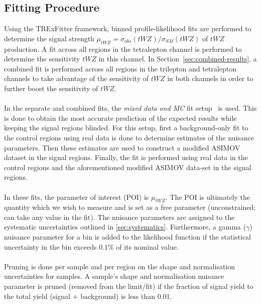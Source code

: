 \subsection{Fitting Procedure}
\label{sec:fitting-procedure}
Using the TRExFitter framework, binned profile-likelihood fits are performed to determine the signal strength $\mu_{tWZ} = \sigma_{obs}(tWZ)/\sigma_{SM}(tWZ)$ of $tWZ$ production. A fit across all regions in the tetralepton channel is performed to determine the sensitivity $tWZ$ in this channel. In Section~\ref{sec:combined-results}, a combined fit is performed across all regions in the trilepton and tetralepton channels to take advantage of the sensitivity of $tWZ$ in both channels in order to further boost the sensitivity of $tWZ$.\\\\

In the separate and combined fits, the \textit{mixed data and MC} fit setup~\cite{MixedDataAndMC_TRF} is used. This is done to obtain the most accurate prediction of the expected results while keeping the signal regions blinded. For this setup, first a background-only fit to the control regions using real data is done to determine estimates of the nuisance parameters. Then these estimates are used to construct a modified ASIMOV dataset in the signal regions. Finally, the fit is performed using real data in the control regions and the aforementioned modified ASIMOV data-set in the signal regions.\\\\

In these fits, the parameter of interest (POI) is $\mu_{tWZ}$. The POI is ultimately the quantity which we wish to measure and is set as a free parameter (unconstrained; can take any value in the fit). The nuisance parameters are assigned to the systematic uncertainties outlined in \ref{sec:systematics}. Furthermore, a gamma ($\gamma$) nuisance parameter for a bin is added to the likelihood function if the statistical uncertainty in the bin exceeds $0.1\%$ of its nominal value.\\\\

Pruning is done per sample and per region on the shape and normalisation uncertainties for samples. A sample's shape and normalisation nuisance parameter is pruned (removed from the limit/fit) if the fraction of signal yield to the total yield (signal $+$ background) is less than 0.01.\\\\

